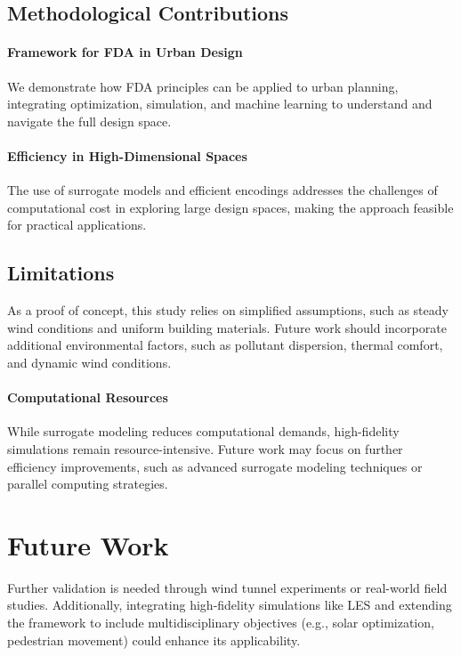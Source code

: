 \documentclass[times,final]{elsarticle}
\begin{document}
\subsection{Methodological Contributions}


\paragraph{Framework for FDA in Urban Design}

We demonstrate how FDA principles can be applied to urban planning,
integrating optimization, simulation, and machine learning to understand
and navigate the full design space.


\paragraph{Efficiency in High-Dimensional Spaces}

The use of surrogate models and efficient encodings addresses the
challenges of computational cost in exploring large design spaces,
making the approach feasible for practical applications.

\subsection{Limitations}

As a proof of concept, this study relies on simplified assumptions, such
as steady wind conditions and uniform building materials. Future work
should incorporate additional environmental factors, such as pollutant
dispersion, thermal comfort, and dynamic wind conditions.

\paragraph{Computational Resources}

While surrogate modeling reduces computational demands, high-fidelity
simulations remain resource-intensive. Future work may focus on further
efficiency improvements, such as advanced surrogate modeling techniques
or parallel computing strategies.

\section{Future Work}

Further validation is needed through wind tunnel experiments or
real-world field studies. Additionally, integrating high-fidelity
simulations like LES and extending the framework to include
multidisciplinary objectives (e.g., solar optimization, pedestrian
movement) could enhance its applicability.
\end{document}
